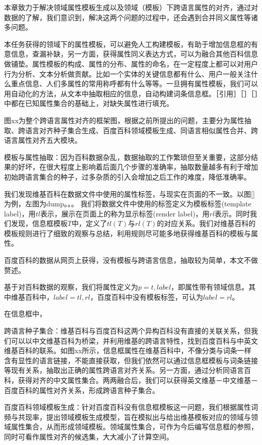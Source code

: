 本章致力于解决领域属性模板生成以及领域（模板）下跨语言属性的对齐，通过对数据的了解，我们意识到，解决这两个问题的过程中，还会遇到合并同义属性等诸多问题。

本任务获得的领域下的属性模板，可以避免人工构建模板，有助于增加信息框的有意信息，查漏补缺，另一方面，获得属性同义表达方式，可以为融合其他百科信息做铺垫。属性模板的构成、属性的分布、属性的命名，在一定程度上都可以对用户行为分析、文本分析做贡献。比如一个实体的关键信息都有什么、用户一般关注什么重点信息、人们多属性的常用称呼都有什么等等。一旦拥有属性模板，我们可以用自动化的方法，从文本中抽取相应的信息，自动构建词条信息框。［引用］［］［］中都在已知属性集合的基础上，对缺失属性进行填充。

图xx为整个跨语言属性对齐的框架图，根据之前所提出的问题，主要分为属性抽取、跨语言对齐种子集合生成、百度百科领域模板生成、同语言相似属性合并、跨语言属性对齐五大模块。

{\heiti 模板与属性抽取：}因为百科数据杂乱，数据抽取的工作繁琐但至关重要，这部分结果的好坏，在很大程度上影响着后面几个步骤的准确率，抽取数量越多有利于增加初始跨语言集合的种子，过多杂质的引入会增加之后工作的难度，降低准确率。

我们发现维基百科在数据文件中使用的属性标签，与现实在页面的不一致。以图\ref{}为例，左图为dump。。。 我们将数据文件中使用的标签定义为模板标签(template label)，用$tl$表示，展示在页面上的称为显示标签(render label)，用$rl$表示。同时我们发现，信息框模板$T$中，定义了$tl(T)$与$rl(T)$的对应关系。我们对维基百科的模板规则进行了细致的观察与总结，利用规则尽可能多地获得维基百科的模板与属性。

百度百科的数据从网页上获得，没有模板与跨语言信息，抽取较为简单，本文不做赘述。

基于对百科数据的观察，我们将属性定义为$p={t,label}$，即属性带有领域信息。其中维基百科中，$label={tl, rl}$，百度百科中没有模板标签，可认为$label=rl$。

在信息框中，


{\heiti 跨语言种子集合：}维基百科与百度百科这两个异构百科没有直接的关联关系，但我们可以以中文维基百科为桥梁，并利用维基的跨语言特性，找到百度百科与中英文维基百科的联系。如图xx所示，信息框属性在维基百科中，不像分类与词条一样含有显性的语言链接，不能直接获取，但我们依然可以通过信息框模板与词条链接等现有关系，抽取出正确的属性跨语言对齐关系。另一方面，通过分析同语言百科，获得对齐的中文属性集合。两两融合后，我们可以获得英文维基－中文维基－百度百科的属性对齐关系，形成跨语言种子集合。

{\heiti 百度百科领域模板生成：}针对百度百科没有信息框模板这一问题，我们根据属性词频与共现率，提出领域模板生成模型，旨在模拟出与给出维基模板对应的领域与领域属性集合，从而形成领域模板。领域属性集合，可作为今后编写信息框的参照，同时可看作属性对齐的候选集，大大减小了计算空间。

